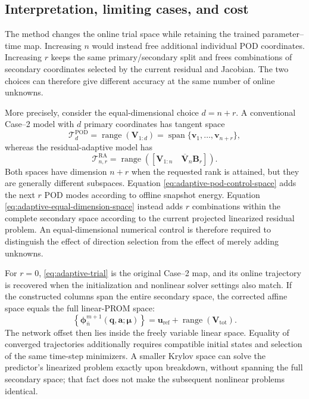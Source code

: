 \documentclass[11pt]{article}
\newcommand{\q}{\mathbf q}
\newcommand{\uvec}{\mathbf u}
\newcommand{\mub}{\bm\mu}
\begin{document}
\subsection{Interpretation, limiting cases, and cost}
The method changes the online trial space while retaining the trained
parameter--time map.  Increasing $n$ would instead free additional individual
POD coordinates.  Increasing $r$ keeps the same primary/secondary split and
frees combinations of secondary coordinates selected by the current
residual and Jacobian.  The two choices can therefore give different
accuracy at the same number of online unknowns.

More precisely, consider the equal-dimensional choice $d=n+r$.  A
conventional Case--2 model with $d$ primary coordinates has tangent space
\begin{equation}
\mathcal T_d^{\mathrm{POD}}
=\operatorname{range}\!\left(\mathbf V_{1:d}\right)
=\operatorname{span}\{\mathbf v_1,\ldots,\mathbf v_{n+r}\},
\label{eq:adaptive-pod-control-space}
\end{equation}
whereas the residual-adaptive model has
\begin{equation}
\mathcal T_{n,r}^{\mathrm{RA}}
=\operatorname{range}\!\left(
\left[\mathbf V_{1:n}\quad
\overline{\mathbf V}_{n}\mathbf B_r\right]\right).
\label{eq:adaptive-equal-dimension-space}
\end{equation}
Both spaces have dimension $n+r$ when the requested rank is attained, but
they are generally different subspaces.  Equation
\eqref{eq:adaptive-pod-control-space} adds the next $r$ POD modes according
to offline snapshot energy.  Equation
\eqref{eq:adaptive-equal-dimension-space} instead adds $r$ combinations
within the complete secondary space according to the current projected
linearized residual problem.  An equal-dimensional numerical control is
therefore required to distinguish the effect of direction selection from
the effect of merely adding unknowns.

For $r=0$, \eqref{eq:adaptive-trial} is the original Case--2 map, and its
online trajectory is recovered when the initialization and nonlinear solver
settings also match.  If the constructed columns span the entire secondary
space, the corrected affine space equals the full linear-PROM space:
\begin{equation}
\left\{\boldsymbol\phi_{\bar n}^{m+1}(\q,\mathbf a;\mub)\right\}
=\uvec_{\mathrm{ref}}+\operatorname{range}(\mathbf V_{\mathrm{tot}}).
\label{eq:adaptive-full-space}
\end{equation}
The network offset then lies inside the freely variable linear space.
Equality of converged trajectories additionally requires compatible initial
states and selection of the same time-step minimizers.  A smaller Krylov
space can solve the predictor's linearized problem exactly upon breakdown,
without spanning the full secondary space; that fact does not make the
subsequent nonlinear problems identical.
\end{document}
